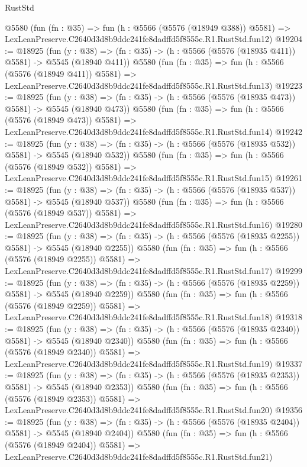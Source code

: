 \begin{lexlean}{RustStd}
\begin{coremodule}
    @5580
    (fun (fn : @35) =>
    fun (h : @5566 (@5576 (@18949 @388)) @5581) =>
    LexLeanPreserve.C2640d3d8b9ddc241fe8dadffd5f8555c.R1.RustStd.fun12)
@19204 := @18925
    (fun (y : @38) => (fn : @35) -> (h : @5566 (@5576 (@18935 @411)) @5581) -> @5545 (@18940 @411))
    @5580
    (fun (fn : @35) =>
    fun (h : @5566 (@5576 (@18949 @411)) @5581) =>
    LexLeanPreserve.C2640d3d8b9ddc241fe8dadffd5f8555c.R1.RustStd.fun13)
@19223 := @18925
    (fun (y : @38) => (fn : @35) -> (h : @5566 (@5576 (@18935 @473)) @5581) -> @5545 (@18940 @473))
    @5580
    (fun (fn : @35) =>
    fun (h : @5566 (@5576 (@18949 @473)) @5581) =>
    LexLeanPreserve.C2640d3d8b9ddc241fe8dadffd5f8555c.R1.RustStd.fun14)
@19242 := @18925
    (fun (y : @38) => (fn : @35) -> (h : @5566 (@5576 (@18935 @532)) @5581) -> @5545 (@18940 @532))
    @5580
    (fun (fn : @35) =>
    fun (h : @5566 (@5576 (@18949 @532)) @5581) =>
    LexLeanPreserve.C2640d3d8b9ddc241fe8dadffd5f8555c.R1.RustStd.fun15)
@19261 := @18925
    (fun (y : @38) => (fn : @35) -> (h : @5566 (@5576 (@18935 @537)) @5581) -> @5545 (@18940 @537))
    @5580
    (fun (fn : @35) =>
    fun (h : @5566 (@5576 (@18949 @537)) @5581) =>
    LexLeanPreserve.C2640d3d8b9ddc241fe8dadffd5f8555c.R1.RustStd.fun16)
@19280 := @18925
    (fun (y : @38) =>
    (fn : @35) -> (h : @5566 (@5576 (@18935 @2255)) @5581) -> @5545 (@18940 @2255))
    @5580
    (fun (fn : @35) =>
    fun (h : @5566 (@5576 (@18949 @2255)) @5581) =>
    LexLeanPreserve.C2640d3d8b9ddc241fe8dadffd5f8555c.R1.RustStd.fun17)
@19299 := @18925
    (fun (y : @38) =>
    (fn : @35) -> (h : @5566 (@5576 (@18935 @2259)) @5581) -> @5545 (@18940 @2259))
    @5580
    (fun (fn : @35) =>
    fun (h : @5566 (@5576 (@18949 @2259)) @5581) =>
    LexLeanPreserve.C2640d3d8b9ddc241fe8dadffd5f8555c.R1.RustStd.fun18)
@19318 := @18925
    (fun (y : @38) =>
    (fn : @35) -> (h : @5566 (@5576 (@18935 @2340)) @5581) -> @5545 (@18940 @2340))
    @5580
    (fun (fn : @35) =>
    fun (h : @5566 (@5576 (@18949 @2340)) @5581) =>
    LexLeanPreserve.C2640d3d8b9ddc241fe8dadffd5f8555c.R1.RustStd.fun19)
@19337 := @18925
    (fun (y : @38) =>
    (fn : @35) -> (h : @5566 (@5576 (@18935 @2353)) @5581) -> @5545 (@18940 @2353))
    @5580
    (fun (fn : @35) =>
    fun (h : @5566 (@5576 (@18949 @2353)) @5581) =>
    LexLeanPreserve.C2640d3d8b9ddc241fe8dadffd5f8555c.R1.RustStd.fun20)
@19356 := @18925
    (fun (y : @38) =>
    (fn : @35) -> (h : @5566 (@5576 (@18935 @2404)) @5581) -> @5545 (@18940 @2404))
    @5580
    (fun (fn : @35) =>
    fun (h : @5566 (@5576 (@18949 @2404)) @5581) =>
    LexLeanPreserve.C2640d3d8b9ddc241fe8dadffd5f8555c.R1.RustStd.fun21)

\end{coremodule}
\end{lexlean}
